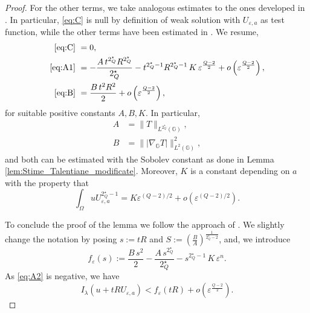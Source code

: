 \documentclass[11pt]{amsart}
\numberwithin{equation}{section} %
\theoremstyle{definition}
\def\G{\mathbb{G}}
\begin{document}
\begin{proof}
For the other terms, we take analogous estimates to the ones developed
in \cite{BiGaVe}. In particular, \eqref{eq:C} is null by definition of
weak solution with $U_{\varepsilon,a}$ as test function,
while the other terms have been estimated in \cite[Lemma 4.3]{BiGaVe}.
We resume,
\begin{align*}
    \eqref{eq:C}&\ =0,\\
\eqref{eq:A1}&\ =-\frac{A\, t^{2^\star_Q}R^{2^\star_Q}}{2^\star_Q}-t^{2^\star_Q -1}R^{2^\star_Q -1}\, K\, \varepsilon^{\frac{Q-2}{2}}+o\left(\varepsilon^{\frac{Q-2}{2}}\right),\\
    \eqref{eq:B}&\ =\frac{B\, t^2R^2}{2}+o\left(\varepsilon^{\frac{Q-2}{2}}\right),
\end{align*}
for suitable positive constants $A,B,K$.
In particular,
\begin{align*}
	A&=\|T\|_{L^{2^\star_Q}(\G)},\\
	B&=\||\nabla_\G T|\|_{L^2(\G)}^2,
\end{align*}
and both can be estimated with the Sobolev constant
as done in Lemma \ref{lem:Stime_Talentiane_modificate}.
Moreover, $K$ is a constant depending on $a$ with the property that
\[
\int_\Omega uU_{\varepsilon,a}^{2^\star_Q -1}=K\varepsilon^{(Q-2)\slash 2}+o(\varepsilon^{(Q-2)\slash2}).
\]

To conclude the proof of the lemma 
we follow the approach of \cite{Tarantello}.
We slightly change the notation by posing
 $s:=tR$ and $S:=\left(\frac{B}{A}\right)^{\frac{1}{2^\star_Q -2}}$,
and, we introduce
\[
f_\varepsilon(s):=\frac{B\, s^2}{2}-\frac{A \, s^{2^\star_Q}}{2^\star_Q}-s^{2^\star_Q -1}\, K\, \varepsilon^n.
\]
As \eqref{eq:A2} is negative, we have
\begin{equation}\label{disIf}
	I_\lambda(u+tRU_{\varepsilon,a})<f_\varepsilon(tR)+o\left(\varepsilon^{\frac{Q-2}{2}}\right).
\end{equation}


\end{proof}
\end{document}
